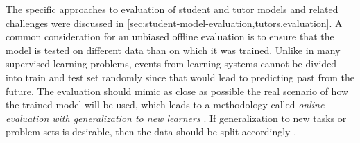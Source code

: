 The specific approaches to evaluation of student and tutor models and related challenges
were discussed in \cref{sec:student-model-evaluation,tutors.evaluation}.
A common consideration for an unbiased offline evaluation is to ensure that the model is
tested on different data than on which it was trained.
Unlike in many supervised learning problems, events from learning systems
cannot be divided into train and test set randomly since that would lead
to predicting past from the future. %
The evaluation should mimic as close as possible the real scenario of how the
trained model will be used, which leads to a methodology called \emph{online
evaluation with generalization to new learners} \cite{pelanek-learner-modeling}.
If generalization to new tasks or problem sets %
is desirable, then the data should be split accordingly \cite{student-models-review-2012}.


%

